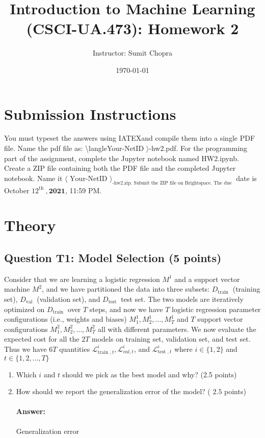 \documentclass[10pt]{article}
\title{Introduction to Machine Learning (CSCI-UA.473): Homework 2 }
\author{Instructor: Sumit Chopra}
\date{\today}
\begin{document}
\maketitle

\section*{Submission Instructions}
You must typeset the answers using IATEXand compile them into a single PDF file. Name the pdf file as: \textbackslash langleYour-NetID $\rangle$-hw2.pdf. For the programming part of the assignment, complete the Jupyter notebook named HW2.ipynb. Create a ZIP file containing both the PDF file and the completed Jupyter notebook. Name it $\langle\text { Your-NetID }\rangle_{\text {-hw2.zip. Submit the ZIP file on Brightspace. The due }}$ date is October $12^{\text {th }}, \mathbf{2 0 2 1}$, 11:59 PM.

\section*{Theory}
\subsection*{Question T1: Model Selection (5 points)}
Consider that we are learning a logistic regression $M^{1}$ and a support vector machine $M^{2}$, and we have partitioned the data into three subsets: $D_{\text {train }}$ (training set), $D_{\text {val }}$ (validation set), and $D_{\text {test }}$ test set. The two models are iteratively optimized on $D_{\text {train }}$ over $T$ steps, and now we have $T$ logistic regression parameter configurations (i.e., weights and biases) $M_{1}^{1}, M_{2}^{1}, \ldots, M_{T}^{1}$ and $T$ support vector configurations $M_{1}^{2}, M_{2}^{2}, \ldots, M_{T}^{2}$ all with different parameters. We now evaluate the expected cost for all the $2 T$ models on training set, validation set, and test set. Thus we have $6 T$ quantities $\mathcal{L}_{\text {train }, t}^{i}, \mathcal{L}_{v a l, t}^{i}$, and $\mathcal{L}_{\text {test }, t}^{i}$ where $i \in\{1,2\}$ and $t \in\{1,2, \ldots, T\}$

\begin{enumerate}
  \item Which $i$ and $t$ should we pick as the best model and why? (2.5 points)

  \item How should we report the generalization error of the model? ( $2.5$ points)

  \paragraph{Answer:} Generalization error 


\end{enumerate}
\end{document}
